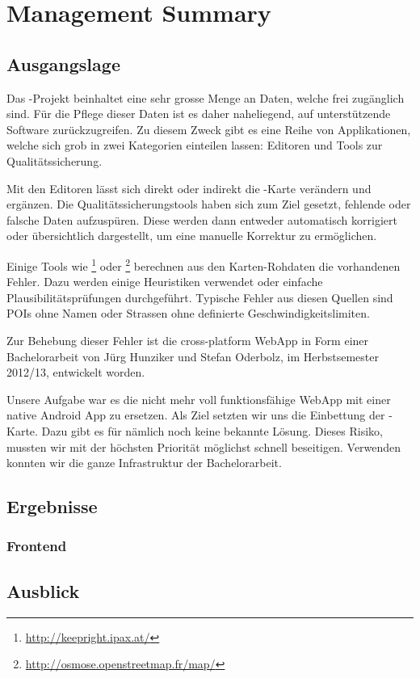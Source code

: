 \chapter*{Management Summary}
\thispagestyle{scrheadings}

\section*{Ausgangslage}
Das -Projekt beinhaltet eine sehr grosse Menge an Daten, welche frei zugänglich sind.
Für die Pflege dieser Daten ist es daher naheliegend, auf unterstützende Software zurückzugreifen.
Zu diesem Zweck gibt es eine Reihe von Applikationen, welche sich grob in zwei Kategorien einteilen lassen:
Editoren und Tools zur Qualitätssicherung.

Mit den Editoren lässt sich direkt oder indirekt die -Karte verändern und ergänzen.
Die Qualitätssicherungstools haben sich zum Ziel gesetzt, fehlende oder falsche Daten aufzuspüren.
Diese werden dann entweder automatisch korrigiert oder übersichtlich dargestellt, um eine manuelle Korrektur zu ermöglichen.

Einige Tools wie \footnote{\url{http://keepright.ipax.at/}} oder \footnote{\url{http://osmose.openstreetmap.fr/map/}} berechnen aus den Karten-Rohdaten die vorhandenen Fehler.
Dazu werden einige Heuristiken verwendet oder einfache Plausibilitätsprüfungen durchgeführt.
Typische Fehler aus diesen Quellen sind \glspl{POI} ohne Namen oder Strassen ohne definierte Geschwindigkeitslimiten.

Zur Behebung dieser Fehler ist die cross-platform \gls{WebApp} \kort{} in Form einer Bachelorarbeit von Jürg Hunziker und Stefan Oderbolz, im Herbstsemester 2012/13, entwickelt  worden.

Unsere Aufgabe war es die nicht mehr voll funktionsfähige \gls{WebApp} mit einer native Android App zu ersetzen.
Als Ziel setzten wir uns die Einbettung der -Karte.
Dazu gibt es für  nämlich noch keine bekannte Lösung. 
Dieses Risiko, mussten wir mit der höchsten Priorität möglichst schnell beseitigen.
Verwenden konnten wir die ganze Infrastruktur der \kort{} Bachelorarbeit.


\section*{Ergebnisse}

\subsection*{Frontend}

\section*{Ausblick}
